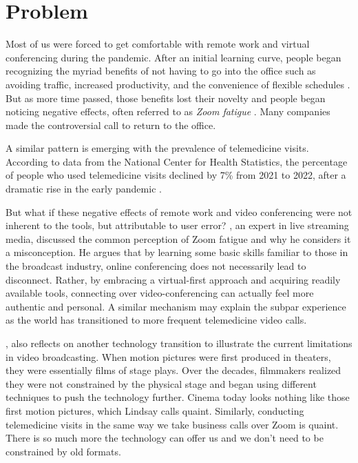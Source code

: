 \documentclass[utf8]{FrontiersinHarvard} %
\begin{document}
\section{Problem}

Most of us were forced to get comfortable with remote work and virtual conferencing during the pandemic. After an initial learning curve, people began recognizing the myriad benefits of not having to go into the office such as avoiding traffic, increased productivity, and the convenience of flexible schedules \citep{mollaTellYourBoss2022, tsipurskyUnlockingRemoteWork2023}. But as more time passed, those benefits lost their novelty and people began noticing negative effects, often referred to as \textit{Zoom fatigue} \citep{bailensonNonverbalOverloadTheoretical2021}. Many companies made the controversial call to return to the office.

A similar pattern is emerging with the prevalence of telemedicine visits. According to data from the National Center for Health Statistics, the percentage of people who used telemedicine visits declined by 7\% from 2021 to 2022, after a dramatic rise in the early pandemic \citep{lucasDeclinesTelemedicineUse2024}.

But what if these negative effects of remote work and video conferencing were not inherent to the tools, but attributable to user error? \citet{lindsayAddressingZoomFatigue2021}, an expert in live streaming media, discussed the common perception of Zoom fatigue and why he considers it a misconception. He argues that by learning some basic skills familiar to those in the broadcast industry, online conferencing does not necessarily lead to disconnect. Rather, by embracing a virtual-first approach and acquiring readily available tools, connecting over video-conferencing can actually feel more authentic and personal. A similar mechanism may explain the subpar experience as the world has transitioned to more frequent telemedicine video calls.

\citet{lindsayHowProduceGreat2019a}, also reflects on another technology transition to illustrate the current limitations in video broadcasting. When motion pictures were first produced in theaters, they were essentially films of stage plays. Over the decades, filmmakers realized they were not constrained by the physical stage and began using different techniques to push the technology further. Cinema today looks nothing like those first motion pictures, which Lindsay calls quaint. Similarly, conducting telemedicine visits in the same way we take business calls over Zoom is quaint. There is so much more the technology can offer us and we don't need to be constrained by old formats.
\end{document}
